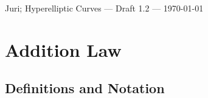 \documentclass[english,11pt,a4paper]{article}
\theoremstyle{definition}
\theoremstyle{remark}
\theoremstyle{case}
\begin{document}


\scriptsize \hfill Juri; Hyperelliptic Curves --- Draft 1.2 --- \today%
\normalsize

\section{Addition Law}


\subsection{Definitions and Notation}
\end{document}
